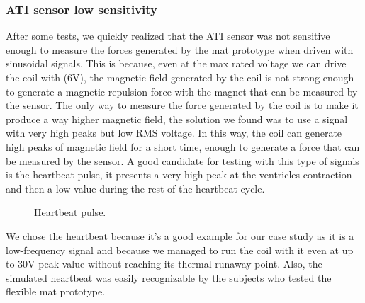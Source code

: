 \subsubsection{ATI sensor low sensitivity}
After some tests, we quickly realized that the ATI sensor was not sensitive enough to measure the forces generated by the mat prototype when driven with sinusoidal signals.
This is because, even at the max rated voltage we can drive the coil with (6V), the magnetic field generated by the coil is not strong enough to generate a magnetic repulsion force with the magnet that can be measured by the sensor.
The only way to measure the force generated by the coil is to make it produce a way higher magnetic field, the solution we found was to use a signal with very high peaks but low RMS voltage.
In this way, the coil can generate high peaks of magnetic field for a short time, enough to generate a force that can be measured by the sensor.
A good candidate for testing with this type of signals is the heartbeat pulse, it presents a very high peak at the ventricles contraction and then a low value during the rest of the heartbeat cycle.
\begin{figure}
    \centering
    \caption{Heartbeat pulse.}
    \label{fig: Heartbeat_pulse}
\end{figure}
We chose the heartbeat because it's a good example for our case study as it is a low-frequency signal and because we managed to run the coil with it even at up to 30V peak value without reaching its thermal runaway point.
Also, the simulated heartbeat was easily recognizable by the subjects who tested the flexible mat prototype.

